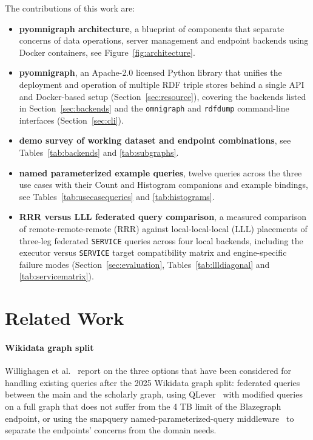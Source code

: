 \documentclass[
]{ceurart}
\begin{document}
The contributions of this work are:
\begin{itemize}
\item \textbf{pyomnigraph architecture}, a blueprint of components that separate concerns of data operations, server management and endpoint backends using Docker containers, see Figure~\ref{fig:architecture}.
\item \textbf{pyomnigraph}, an Apache-2.0 licensed Python library that unifies the deployment and operation of multiple RDF triple stores behind a single API and Docker-based setup (Section~\ref{sec:resource}), covering the backends listed in Section~\ref{sec:backends} and the \texttt{omnigraph} and \texttt{rdfdump} command-line interfaces (Section~\ref{sec:cli}).
\item \textbf{demo survey of working dataset and endpoint combinations}, see Tables~\ref{tab:backends} and \ref{tab:subgraphs}.
\item \textbf{named parameterized example queries}, twelve queries across the three use cases with their Count and Histogram companions and example bindings, see Tables~\ref{tab:usecasequeries} and \ref{tab:histograms}.
\item \textbf{RRR versus LLL federated query comparison}, a measured comparison of remote-remote-remote (RRR) against local-local-local (LLL) placements of three-leg federated \texttt{SERVICE} queries across four local backends, including the executor versus \texttt{SERVICE} target compatibility matrix and engine-specific failure modes (Section~\ref{sec:evaluation}, Tables~\ref{tab:llldiagonal} and \ref{tab:servicematrix}).
\end{itemize}

\section{Related Work}\label{sec:relatedwork}
\paragraph{Wikidata graph split}
Willighagen et al.~\cite{willighagen2026scholia} report on the three options that have been considered for handling existing queries after the 2025 Wikidata graph split: federated queries between the main and the scholarly graph, using QLever~\cite{bast2017qlever} with modified queries on a full graph that does not suffer from the 4 TB limit of the Blazegraph endpoint, or using the snapquery named-parameterized-query middleware~\cite{fahl_snapquery_2026} to separate the endpoints' concerns from the domain needs.
\end{document}
